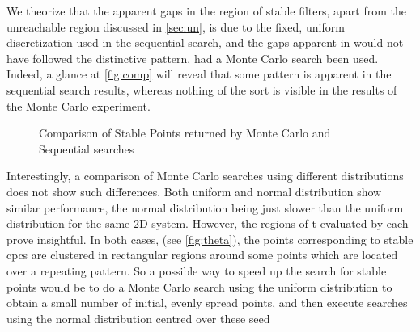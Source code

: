 We theorize that the apparent gaps in the region of stable filters, apart 
from the unreachable region discussed in \autoref{sec:un}, is due to the 
fixed, uniform discretization used in the sequential search, and the gaps 
apparent in  \cite[Fig. 4-10]{Jiffri2011} would not have followed the 
distinctive pattern, had a Monte Carlo search been used. Indeed, a glance 
at \autoref{fig:comp} will reveal that some pattern is apparent in the 
sequential search results, whereas nothing of the sort is visible in the 
results of the Monte Carlo experiment.
\begin{figure}
\caption{Comparison of Stable Points returned by Monte Carlo and Sequential searches}
\label{fig:comp}
\end{figure}
Interestingly, a comparison of Monte Carlo searches using different 
distributions does not show such differences. Both uniform and normal 
distribution show similar performance, the normal distribution being just 
slower than the uniform distribution for the same 2D system. However, the 
regions of \gls{t} evaluated by each prove insightful. In both cases, (see 
\autoref{fig:theta}), the points corresponding to stable \glspl{cpc} are 
clustered in rectangular regions around some points which are located over 
a repeating pattern. So a possible way to speed up the search for stable 
points would be to do a Monte Carlo search using the uniform distribution 
to obtain a small number of initial, evenly spread points, and then 
execute searches using the normal distribution centred over these seed 
